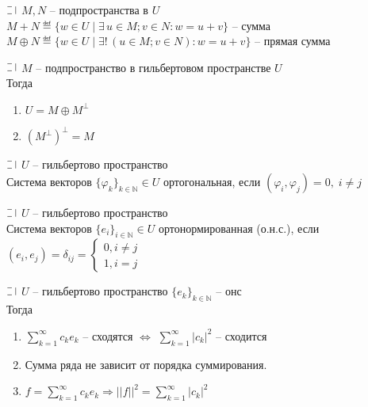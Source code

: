 \begin{definition}
  $\letus$ $M, N$ -- подпространства в $U$\\
  $M + N \eqdef \{w \in U \mid \exists \, u \in M; v\in N: w = u + v\}$ -- сумма\\
  $M \oplus N \eqdef \{w \in U \mid \exists ! \, (u \in M; v\in N): w = u + v\}$ -- прямая сумма
\end{definition}

\begin{theorem}
  $\letus$ $M$ -- подпространство в гильбертовом пространстве $U$\\
  Тогда\begin{minipage}[t]{0.8\linewidth}\begin{enumerate}[itemsep=1mm]
    \item $U = M \oplus M^{\perp}$
    \item $(M^{\perp})^{\perp} = M$
  \end{enumerate}\end{minipage}
\end{theorem}

\begin{definition}
  $\letus$ $U$ -- гильбертово пространство\\
  Система векторов $\{\varphi_k\}_{k\in \mathbb{N}} \in U$ ортогональная, если $(\varphi_i, \varphi_j) = 0, \; i \not= j$
\end{definition}

\begin{definition}
  $\letus$ $U$ -- гильбертово пространство\\
  Система векторов $\{e_i\}_{i \in \mathbb{N}} \in U$ ортонормированная (о.н.с.), если
  $(e_i, e_j) = \delta_{ij} = \left\{ \begin{aligned}0, i \not= j\\ 1, i = j\end{aligned} \right.$
\end{definition}

\begin{theorem}
  $\letus$ $U$ -- гильбертово пространство  $\{e_k\}_{k \in \mathbb{N}}$ -- онс\\
  Тогда\begin{minipage}[t]{0.8\linewidth}\begin{enumerate}[itemsep=1mm]
      \item $\sum\limits_{k = 1}^{\infty}c_k e_k$ -- сходятся $\Leftrightarrow$ $\sum\limits_{k = 1}^{\infty}|c_k|^2$ -- сходится
      \item Сумма ряда не зависит от порядка суммирования.
      \item $f = \sum\limits_{k = 1}^{\infty}c_k e_k \Rightarrow ||f||^2 = \sum\limits_{k = 1}^{\infty} |c_k|^2$
  \end{enumerate}\end{minipage}
\end{theorem}

